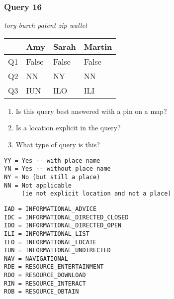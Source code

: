 \begin{frame}[fragile]
\frametitle{Query 16}
\vspace{1em}

\emph{tory burch patent zip wallet}

\vfill

\begin{table}
  \centering
  \begin{tabular}{ l l l l }
    & \textbf{Amy} & \textbf{Sarah} & \textbf{Martin}\\
    \toprule
    Q1 & False & False & False\\
Q2 & NN & NY & NN\\
Q3 & IUN & ILO & ILI\\
    \bottomrule
  \end{tabular}
\end{table}

\vfill

\tiny{

\begin{enumerate}
\item Is this query best answered with a pin on a map?
\item Is a location explicit in the query?
\item What type of query is this?
\end{enumerate}

\vfill

\begin{multicols}{2}
\begin{verbatim}
YY = Yes -- with place name
YN = Yes -- without place name
NY = No (but still a place)
NN = Not applicable 
     (ie not explicit location and not a place)
\end{verbatim}

\columnbreak
\begin{verbatim}
IAD = INFORMATIONAL_ADVICE
IDC = INFORMATIONAL_DIRECTED_CLOSED
IDO = INFORMATIONAL_DIRECTED_OPEN
ILI = INFORMATIONAL_LIST
ILO = INFORMATIONAL_LOCATE
IUN = INFORMATIONAL_UNDIRECTED
NAV = NAVIGATIONAL
RDE = RESOURCE_ENTERTAINMENT
RDO = RESOURCE_DOWNLOAD
RIN = RESOURCE_INTERACT
ROB = RESOURCE_OBTAIN
\end{verbatim}
\end{multicols}
}

\end{frame}


